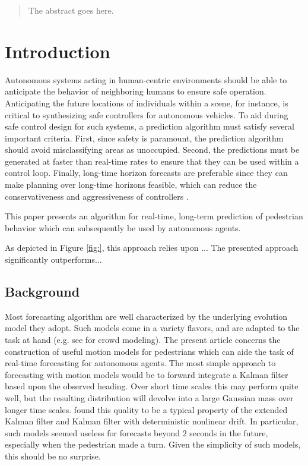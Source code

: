 \documentclass[conference]{IEEEtran}
\begin{document}
\begin{abstract}
The abstract goes here.
\end{abstract}

\IEEEpeerreviewmaketitle

\section{Introduction}

Autonomous systems acting in human-centric environments should be able to anticipate the behavior of neighboring humans to ensure safe operation. 
Anticipating the future locations of individuals within a scene, for instance, is critical to synthesizing safe controllers for autonomous vehicles.
To aid during safe control design for such systems, a prediction algorithm must satisfy several important criteria.
First, since safety is paramount, the prediction algorithm should avoid misclassifying areas as unoccupied.
Second, the predictions must be generated at faster than real-time rates to ensure that they can be used within a control loop.
Finally, long-time horizon forecasts are preferable since they can make planning over long-time horizons feasible, which can reduce the conservativeness and aggressiveness of controllers \cite{}.

This paper presents an algorithm for real-time, long-term prediction of pedestrian behavior which can subsequently be used by autonomous agents.

As depicted in Figure \ref{fig:}, this approach relies upon ... 
The presented approach significantly outperforms...


\subsection{Background}
Most forecasting algorithm are well characterized by the underlying evolution model they adopt.
Such models come in a variety flavors, and are adapted to the task at hand (e.g. see \cite{Helbing1992} for crowd modeling).
The present article concerns the construction of useful motion models for pedestrians which can aide the task of real-time forecasting for autonomous agents.
The most simple approach to forecasting with motion models would be to forward integrate a Kalman filter \cite{kalman1960new} based upon the observed heading.
Over short time scales this may perform quite well, but the resulting distribution will devolve into a large Gaussian mass over longer time scales.
\citet{Schneider2013} found this quality to be a typical property of the extended Kalman filter and Kalman filter with deterministic nonlinear drift.
In particular, such models seemed useless for forecasts beyond $2$ seconds in the future, especially when the pedestrian made a turn.
Given the simplicity of such models, this should be no surprise.
\end{document}
